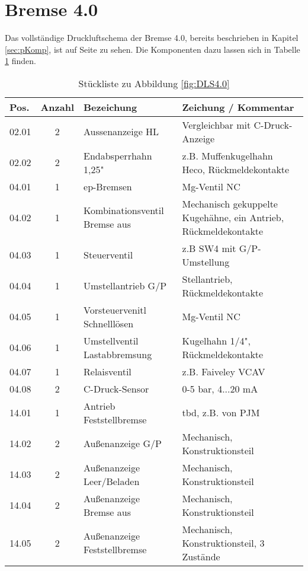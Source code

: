 \section{Bremse 4.0}\label{sec:A_Bremse40}
Das vollständige Druckluftschema der Bremse 4.0, bereits beschrieben in Kapitel \ref{sec:pKomp}, ist auf Seite \pageref{fig:DLS4.0} zu sehen. Die Komponenten dazu lassen sich in Tabelle \ref{tab:Bremse40Komp} finden.
\begin{table}[h]
    \centering
    \begin{tabular}{|p{3em}cp{10.5em}p{18.5em}|}
    \hline
    Pos.  & \multicolumn{1}{p{2.5em}}{Anzahl} & Bezeichung & Zeichung / Kommentar  \\\hline
    02.01 & 2     & Aussenanzeige HL & Vergleichbar mit C-Druck-Anzeige \\
    02.02 & 2     & Endabsperrhahn 1,25" & z.B. Muffenkugelhahn Heco, Rückmeldekontakte \\
    
    04.01 & 1     & ep-Bremsen & Mg-Ventil NC \\
    04.02 & 1     & Kombinationsventil Bremse aus & Mechanisch gekuppelte Kugehähne, ein Antrieb, Rückmeldekontakte \\
    04.03 & 1     & Steuerventil & z.B SW4 mit G/P-Umstellung \\
    04.04 & 1     & Umstellantrieb G/P & Stellantrieb, Rückmeldekontakte \\
    04.05 & 1     & Vorsteuervenitl Schnelllösen & Mg-Ventil NC \\
    04.06 & 1     & Umstellventil Lastabbremsung & Kugelhahn 1/4", Rückmeldekontakte \\
    04.07 & 1     & Relaisventil & z.B. Faiveley VCAV \\
    04.08 & 2     & C-Druck-Sensor & 0-5 bar, 4...20 mA \\
    
    14.01 & 1     & Antrieb Feststellbremse & tbd, z.B. von PJM \\
    14.02 & 2     & Außenanzeige G/P & Mechanisch, Konstruktionsteil \\
    14.03 & 2     & Außenanzeige Leer/Beladen & Mechanisch, Konstruktionsteil \\
    14.04 & 2     & Außenanzeige Bremse aus & Mechanisch, Konstruktionsteil \\
    14.05 & 2     & Außenanzeige Feststellbremse & Mechanisch, Konstruktionsteil, 3 Zustände \\\hline
    \end{tabular}%
    \caption{Stückliste zu Abbildung \ref{fig:DLS4.0}}
    \label{tab:Bremse40Komp}
\end{table}
 \label{fig:DLS4.0}
